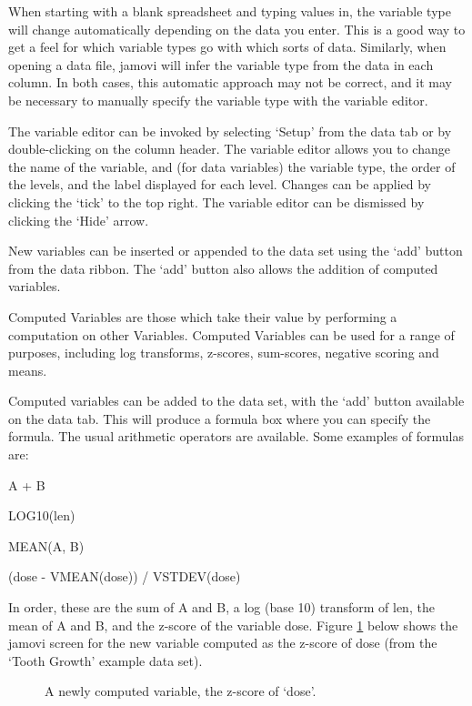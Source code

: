 When starting with a blank spreadsheet and typing values in, the variable type will change automatically depending on the data you enter. This is a good way to get a feel for which variable types go with which sorts of data. Similarly, when opening a data file, jamovi will infer the variable type from the data in each column. In both cases, this automatic approach may not be correct, and it may be necessary to manually specify the variable type with the variable editor.

The variable editor can be invoked by selecting ‘Setup’ from the data tab or by double-clicking on the column header. The variable editor allows you to change the name of the variable, and (for data variables) the variable type, the order of the levels, and the label displayed for each level. Changes can be applied by clicking the ‘tick’ to the top right. The variable editor can be dismissed by clicking the `Hide' arrow.

New variables can be inserted or appended to the data set using the ‘add’ button from the data ribbon. The ‘add’ button also allows the addition of computed variables.



Computed Variables are those which take their value by performing a computation on other Variables. Computed Variables can be used for a range of purposes, including log transforms, z-scores, sum-scores, negative scoring and means.

Computed variables can be added to the data set, with the ‘add’ button available on the data tab. This will produce a formula box where you can specify the formula. The usual arithmetic operators are available. Some examples of formulas are:

A + B

LOG10(len)

MEAN(A, B)

(dose - VMEAN(dose)) / VSTDEV(dose)

In order, these are the sum of A and B, a log (base 10) transform of len, the mean of A and B, and the z-score of the variable dose. Figure \ref{fig:computedvariable} below shows the jamovi screen for the new variable computed as the z-score of dose (from the `Tooth Growth' example data set).

\vspace*{1cm}
\begin{figure}[ht]
\begin{center}
\caption{A newly computed variable, the z-score of `dose'.}
\label{fig:computedvariable}
\end{center}
\end{figure}


